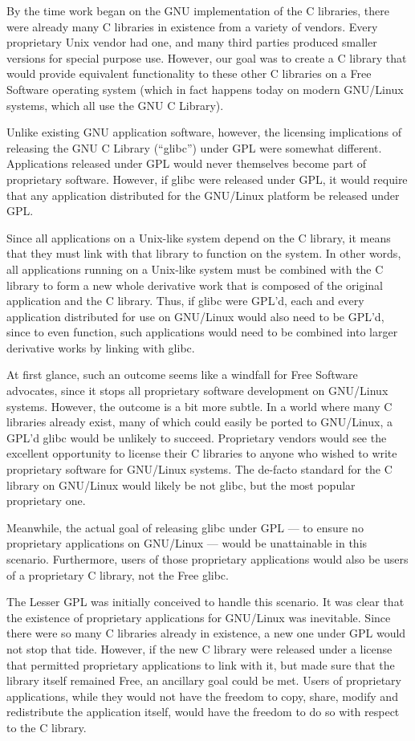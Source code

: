 By the time work began on the GNU implementation of the C libraries, there
were already many C libraries in existence from a variety of vendors.
Every proprietary Unix vendor had one, and many third parties produced
smaller versions for special purpose use. However, our goal was to create
a C library that would provide equivalent functionality to these other C
libraries on a Free Software operating system (which in fact happens today
on modern GNU/Linux systems, which all use the GNU C Library).

Unlike existing GNU application software, however, the licensing
implications of releasing the GNU C Library (``glibc'') under GPL were
somewhat different. Applications released under GPL would never
themselves become part of proprietary software. However, if glibc were
released under GPL, it would require that any application distributed for
the GNU/Linux platform be released under GPL\@.

Since all applications on a Unix-like system depend on the C library, it
means that they must link with that library to function on the system. In
other words, all applications running on a Unix-like system must be
combined with the C library to form a new whole derivative work that is
composed of the original application and the C library. Thus, if glibc
were GPL'd, each and every application distributed for use on GNU/Linux
would also need to be GPL'd, since to even function, such applications
would need to be combined into larger derivative works by linking with
glibc.

At first glance, such an outcome seems like a windfall for Free Software
advocates, since it stops all proprietary software development on
GNU/Linux systems. However, the outcome is a bit more subtle. In a world
where many C libraries already exist, many of which could easily be ported
to GNU/Linux, a GPL'd glibc would be unlikely to succeed. Proprietary
vendors would see the excellent opportunity to license their C libraries
to anyone who wished to write proprietary software for GNU/Linux systems.
The de-facto standard for the C library on GNU/Linux would likely be not
glibc, but the most popular proprietary one.

Meanwhile, the actual goal of releasing glibc under GPL --- to ensure no
proprietary applications on GNU/Linux --- would be unattainable in this
scenario. Furthermore, users of those proprietary applications would also
be users of a proprietary C library, not the Free glibc.

The Lesser GPL was initially conceived to handle this scenario. It was
clear that the existence of proprietary applications for GNU/Linux was
inevitable. Since there were so many C libraries already in existence, a
new one under GPL would not stop that tide. However, if the new C library
were released under a license that permitted proprietary applications
to link with it, but made sure that the library itself remained Free,
an ancillary goal could be met. Users of proprietary applications, while
they would not have the freedom to copy, share, modify and redistribute
the application itself, would have the freedom to do so with respect to
the C library.

